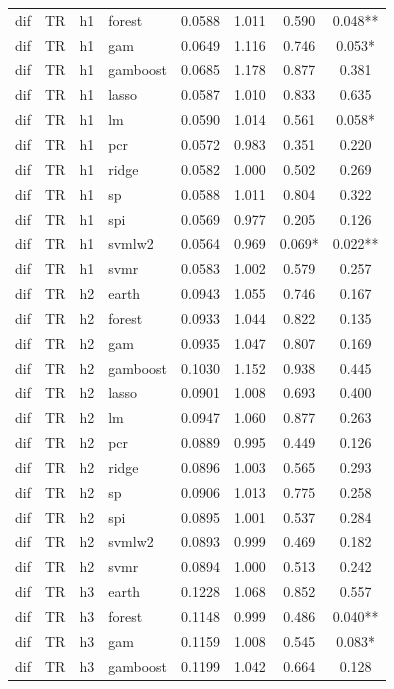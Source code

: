 \begin{ThreePartTable}
\begin{longtable}[t]{llclcccc}
dif & TR & h1 & forest & 0.0588 & 1.011 & 0.590 & 0.048**\\
dif & TR & h1 & gam & 0.0649 & 1.116 & 0.746 & 0.053*\\
dif & TR & h1 & gamboost & 0.0685 & 1.178 & 0.877 & 0.381\\
dif & TR & h1 & lasso & 0.0587 & 1.010 & 0.833 & 0.635\\
dif & TR & h1 & lm & 0.0590 & 1.014 & 0.561 & 0.058*\\
dif & TR & h1 & pcr & 0.0572 & 0.983 & 0.351 & 0.220\\
dif & TR & h1 & ridge & 0.0582 & 1.000 & 0.502 & 0.269\\
dif & TR & h1 & sp & 0.0588 & 1.011 & 0.804 & 0.322\\
dif & TR & h1 & spi & 0.0569 & 0.977 & 0.205 & 0.126\\
dif & TR & h1 & svmlw2 & 0.0564 & 0.969 & 0.069* & 0.022**\\
dif & TR & h1 & svmr & 0.0583 & 1.002 & 0.579 & 0.257\\
\addlinespace
dif & TR & h2 & earth & 0.0943 & 1.055 & 0.746 & 0.167\\
dif & TR & h2 & forest & 0.0933 & 1.044 & 0.822 & 0.135\\
dif & TR & h2 & gam & 0.0935 & 1.047 & 0.807 & 0.169\\
dif & TR & h2 & gamboost & 0.1030 & 1.152 & 0.938 & 0.445\\
dif & TR & h2 & lasso & 0.0901 & 1.008 & 0.693 & 0.400\\
dif & TR & h2 & lm & 0.0947 & 1.060 & 0.877 & 0.263\\
dif & TR & h2 & pcr & 0.0889 & 0.995 & 0.449 & 0.126\\
dif & TR & h2 & ridge & 0.0896 & 1.003 & 0.565 & 0.293\\
dif & TR & h2 & sp & 0.0906 & 1.013 & 0.775 & 0.258\\
dif & TR & h2 & spi & 0.0895 & 1.001 & 0.537 & 0.284\\
dif & TR & h2 & svmlw2 & 0.0893 & 0.999 & 0.469 & 0.182\\
dif & TR & h2 & svmr & 0.0894 & 1.000 & 0.513 & 0.242\\
\addlinespace
dif & TR & h3 & earth & 0.1228 & 1.068 & 0.852 & 0.557\\
dif & TR & h3 & forest & 0.1148 & 0.999 & 0.486 & 0.040**\\
dif & TR & h3 & gam & 0.1159 & 1.008 & 0.545 & 0.083*\\
dif & TR & h3 & gamboost & 0.1199 & 1.042 & 0.664 & 0.128\\

\end{longtable}
\end{ThreePartTable}
